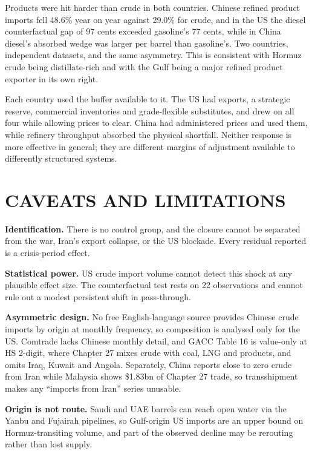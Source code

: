 \documentclass[11pt]{article}
\begin{document}
Products were hit harder than crude in both countries. Chinese refined
product imports fell 48.6\% year on year against 29.0\% for crude, and
in the US the diesel counterfactual gap of 97 cents exceeded gasoline's
77 cents, while in China diesel's absorbed wedge was larger per barrel
than gasoline's. Two countries, independent datasets, and the same
asymmetry. This is consistent with Hormuz crude being distillate-rich
and with the Gulf being a major refined product exporter in its own
right.

Each country used the buffer available to it. The US had exports, a
strategic reserve, commercial inventories and grade-flexible
substitutes, and drew on all four while allowing prices to clear. China
had administered prices and used them, while refinery throughput
absorbed the physical shortfall. Neither response is more effective in
general; they are different margins of adjustment available to
differently structured systems.

\section{CAVEATS AND LIMITATIONS}

\textbf{Identification.} There is no control group, and the closure
cannot be separated from the war, Iran's export collapse, or the US
blockade. Every residual reported is a crisis-period effect.

\textbf{Statistical power.} US crude import volume cannot detect this
shock at any plausible effect size. The counterfactual test rests on 22
observations and cannot rule out a modest persistent shift in
pass-through.

\textbf{Asymmetric design.} No free English-language source provides
Chinese crude imports by origin at monthly frequency, so composition is
analysed only for the US. Comtrade lacks Chinese monthly detail, and
GACC Table 16 is value-only at HS 2-digit, where Chapter 27 mixes crude
with coal, LNG and products, and omits Iraq, Kuwait and Angola.
Separately, China reports close to zero crude from Iran while Malaysia
shows \$1.83bn of Chapter 27 trade, so transshipment makes any
``imports from Iran'' series unusable.

\textbf{Origin is not route.} Saudi and UAE barrels can reach open water
via the Yanbu and Fujairah pipelines, so Gulf-origin US imports are an
upper bound on Hormuz-transiting volume, and part of the observed
decline may be rerouting rather than lost supply.
\end{document}

